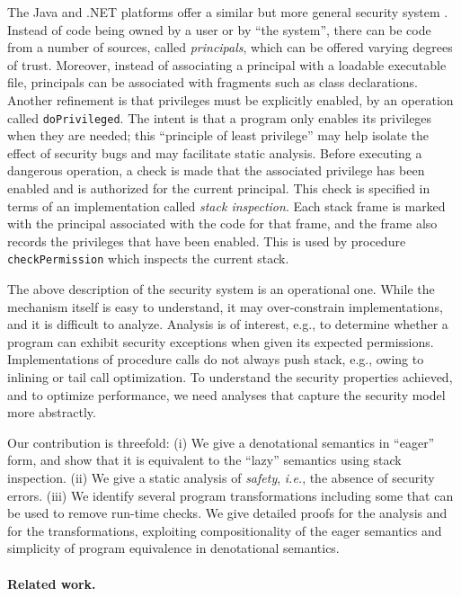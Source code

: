 \documentclass[submission,copyright,creativecommons]{eptcs}
\newcommand{\ie}{{\em i.e.}}
\begin{document}
The Java and .NET platforms offer a similar but more general security system \cite{Gong99,LaMacchiaEtal02}.
Instead of code being owned by a user or
by ``the system'', there can be code from a number of sources, called
\emph{principals}, which can be offered varying degrees of trust.
Moreover, instead of associating a principal with a loadable
executable file, principals can be associated with fragments such as
class declarations.  Another refinement is that
privileges must be explicitly enabled, by an operation called
\texttt{doPrivileged}.  The intent is that a program only enables its
privileges when they are needed; this ``principle of least privilege''
\cite{Gong99} may help isolate the effect of security bugs and may
facilitate static analysis.  Before executing a dangerous operation, a
check is made that the associated privilege has been enabled and is
authorized for the current principal.  This check is specified in
terms of an implementation called \textit{stack inspection}.  Each
stack frame is marked with the principal associated with the code for
that frame, and the frame also records the privileges that have been
enabled.  This is used by procedure \texttt{checkPermission} which
inspects the current stack.    

The above description of the security system is an operational one.
While the mechanism itself is easy to understand, it may over-constrain implementations,
and it is difficult to analyze.
Analysis is of interest, e.g., to determine whether a program can exhibit security exceptions when given its expected permissions.  
Implementations of procedure calls do not always push stack, e.g., owing to inlining or tail call optimization.  
To understand the security properties achieved, and to optimize performance, we need analyses that capture the security model more abstractly.  

Our contribution is threefold: 
(i) We give a denotational semantics in ``eager'' form,
and show that it is equivalent to the ``lazy'' semantics using stack inspection.
(ii) We give a static analysis of \emph{safety}, \ie, the absence of security errors.
(iii) We identify several program transformations including some that can be used to remove run-time
checks. 
We give detailed proofs for the analysis and for the transformations, exploiting compositionality of the eager semantics and simplicity of program equivalence in denotational semantics.




\paragraph{Related work.}
\end{document}

